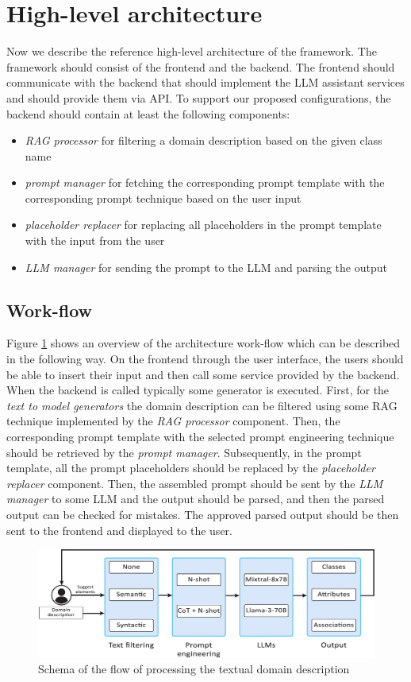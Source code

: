 \section{High-level architecture}
\label{sec:high_level_architecture}

Now we describe the reference high-level architecture of the framework. The framework should consist of the frontend and the backend. The frontend should communicate with the backend that should implement the LLM assistant services and should provide them via API. To support our proposed configurations, the backend should contain at least the following components:

\begin{itemize}
\item \emph{RAG processor} for filtering a domain description based on the given class name
\item \emph{prompt manager} for fetching the corresponding prompt template with the corresponding prompt technique based on the user input
\item \emph{placeholder replacer} for replacing all placeholders in the prompt template with the input from the user
\item \emph{LLM manager} for sending the prompt to the LLM and parsing the output
\end{itemize}


\subsection{Work-flow}

Figure \ref{fig:work-flow} shows an overview of the architecture work-flow which can be described in the following way. On the frontend through the user interface, the users should be able to insert their input and then call some service provided by the backend. When the backend is called typically some generator is executed. First, for the \emph{text to model generators} the domain description can be filtered using some RAG technique implemented by the \emph{RAG processor} component. Then, the corresponding prompt template with the selected prompt engineering technique should be retrieved by the \emph{prompt manager}. Subsequently, in the prompt template, all the prompt placeholders should be replaced by the \emph{placeholder replacer} component. Then, the assembled prompt should be sent by the \emph{LLM manager} to some LLM and the output should be parsed, and then the parsed output can be checked for mistakes. The approved parsed output should be then sent to the frontend and displayed to the user.

\begin{figure}[!h]
    \centering
    \includegraphics[scale=0.23]{img/work-flow.jpg}
    \caption{\centering Schema of the flow of processing the textual domain description}
    \label{fig:work-flow}
\end{figure}
